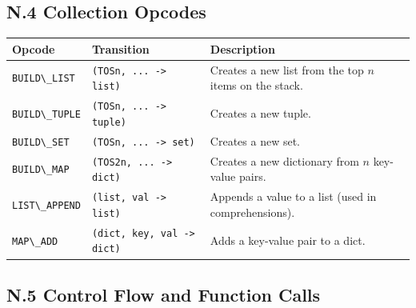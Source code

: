 \hypertarget{n.4-collection-opcodes}{%
\subsection{N.4 Collection Opcodes}\label{n.4-collection-opcodes}}

\begin{longtable}[]{@{}
  >{\raggedright\arraybackslash}p{}
  >{\raggedright\arraybackslash}p{}
  >{\raggedright\arraybackslash}p{}@{}}
\toprule
Opcode & Transition & Description \\
\midrule
\endhead
\passthrough{\lstinline!BUILD\_LIST!} &
\passthrough{\lstinline!(TOSn, ... -> list)!} & Creates a new list from
the top \(n\) items on the stack. \\
\passthrough{\lstinline!BUILD\_TUPLE!} &
\passthrough{\lstinline!(TOSn, ... -> tuple)!} & Creates a new tuple. \\
\passthrough{\lstinline!BUILD\_SET!} &
\passthrough{\lstinline!(TOSn, ... -> set)!} & Creates a new set. \\
\passthrough{\lstinline!BUILD\_MAP!} &
\passthrough{\lstinline!(TOS2n, ... -> dict)!} & Creates a new
dictionary from \(n\) key-value pairs. \\
\passthrough{\lstinline!LIST\_APPEND!} &
\passthrough{\lstinline!(list, val -> list)!} & Appends a value to a
list (used in comprehensions). \\
\passthrough{\lstinline!MAP\_ADD!} &
\passthrough{\lstinline!(dict, key, val -> dict)!} & Adds a key-value
pair to a dict. \\
\bottomrule
\end{longtable}

\hypertarget{n.5-control-flow-and-function-calls}{%
\subsection{N.5 Control Flow and Function
Calls}\label{n.5-control-flow-and-function-calls}}

